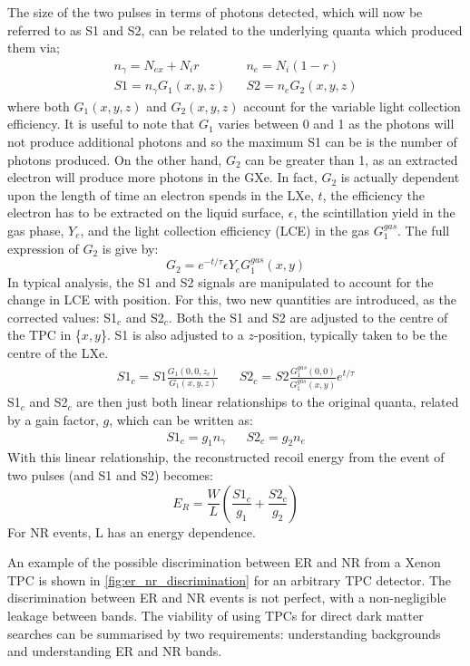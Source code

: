 \par
The size of the two pulses in terms of photons detected, which will now be referred to as S1 and S2, can be related to the underlying quanta which produced them via;
\begin{align}
    n_\gamma = N_{ex} + N_i r && n_e = N_i (1-r) \\
    S1 = n_\gamma G_1(x,y,z) && S2 = n_e G_2(x,y,z)
\end{align}
where both $G_1(x,y,z)$ and $G_2(x,y,z)$ account for the variable light collection efficiency.
It is useful to note that $G_1$ varies between 0 and 1 as the photons will not produce additional photons and so the maximum S1 can be is the number of photons produced.
On the other hand, $G_2$ can be greater than 1, as an extracted electron will produce more photons in the GXe.
In fact, $G_2$ is actually dependent upon the length of time an electron spends in the LXe, $t$, the efficiency the electron has to be extracted on the liquid surface, $\epsilon$, the scintillation yield in the gas phase, $Y_e$, and the light collection efficiency (LCE) in the gas $G_1^{gas}$.
The full expression of $G_2$ is give by:
\begin{equation}
    G_2 = e^{-t/\tau} \epsilon Y_e G_1^{gas}(x,y)
\end{equation}
In typical analysis, the S1 and S2 signals are manipulated to account for the change in LCE with position.
For this, two new quantities are introduced, as the corrected values: S1$_c$ and S2$_c$.
Both the S1 and S2 are adjusted to the centre of the TPC in \{$x,y$\}.
S1 is also adjusted to a $z$-position, typically taken to be the centre of the LXe.
\begin{align}
    S1_c = S1 \frac{G_1(0,0,z_c)}{G_1(x,y,z)} && S2_c = S2 \frac{G_1^{gas}(0,0)}{G_1^{gas}(x,y)} e^{t/\tau}
    \label{eq:s1c_and_s2c_full}
\end{align}
S1$_c$ and S2$_c$ are then just both linear relationships to the original quanta, related by a gain factor, $g$, which can be written as:
\begin{align}
    S1_c = g_1 n_\gamma && S2_c = g_2 n_e
\end{align}
With this linear relationship, the reconstructed recoil energy from the event of two pulses (and S1 and S2) becomes:
\begin{equation}
    E_R = \frac{W}{L}(\frac{S1_c}{g_1} + \frac{S2_c}{g_2})
\end{equation}
For NR events, L has an energy dependence.
\par
An example of the possible discrimination between ER and NR from a Xenon TPC is shown in \autoref{fig:er_nr_discrimination} for an arbitrary TPC detector.
The discrimination between ER and NR events is not perfect, with a non-negligible leakage between bands.
The viability of using TPCs for direct dark matter searches can be summarised by two requirements: understanding backgrounds and understanding ER and NR bands.

